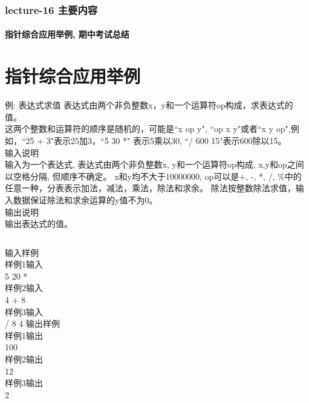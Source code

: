 \begin{frame}[shrink]
  \frametitle{lecture-16 主要内容}
  \framesubtitle{指针综合应用举例, 期中考试总结}
  \tableofcontents
\end{frame}

\section{指针综合应用举例}

\begin{frame}{例: 表达式求值}
表达式由两个非负整数x，y和一个运算符op构成，求表达式的值。\\
这两个整数和运算符的顺序是随机的，可能是``x op y", ``op x y"或者``x y op",例如，``25 + 3"表示25加3，``5 30 *" 表示5乘以30, ``/ 600 15"表示600除以15。\\
输入说明\\	
输入为一个表达式, 表达式由两个非负整数x, y和一个运算符op构成, x,y和op之间以空格分隔, 但顺序不确定。
x和y均不大于10000000, op可以是+, -, *, /, \%中的任意一种，分表表示加法，减法，乘法，除法和求余。
除法按整数除法求值，输入数据保证除法和求余运算的y值不为0。\\
输出说明\\	
输出表达式的值。\\
\medskip
\begin{columns}
	输入样例\\	
	样例1输入\\
	5 20 *\\
	样例2输入\\
	4 + 8\\
	样例3输入\\
	/ 8 4
	输出样例\\	
	样例1输出\\
	100\\
	样例2输出\\
	12\\
	样例3输出\\
	2
\end{columns}
\medskip
\end{frame}

